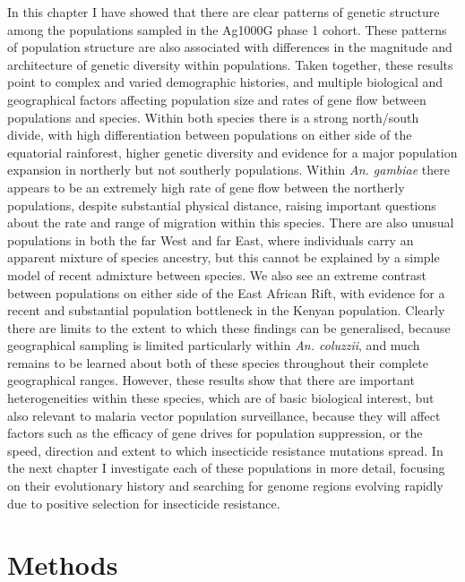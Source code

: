 \documentclass[a4paper,11pt,abstracton,hidelinks]{scrartcl}
\begin{document}
In this chapter I have showed that there are clear patterns of genetic structure among the populations sampled in the Ag1000G phase 1 cohort.
%
These patterns of population structure are also associated with differences in the magnitude and architecture of genetic diversity within populations.
%
Taken together, these results point to complex and varied demographic histories, and multiple biological and geographical factors affecting population size and rates of gene flow between populations and species.
%
Within both species there is a strong north/south divide, with high differentiation between populations on either side of the equatorial rainforest, higher genetic diversity and evidence for a major population expansion in northerly but not southerly populations.
%
Within \textit{An. gambiae} there appears to be an extremely high rate of gene flow between the northerly populations, despite substantial physical distance, raising important questions about the rate and range of migration within this species.
%
There are also unusual populations in both the far West and far East, where individuals carry an apparent mixture of species ancestry, but this cannot be explained by a simple model of recent admixture between species.
%
We also see an extreme contrast between populations on either side of the East African Rift, with evidence for a recent and substantial population bottleneck in the Kenyan population.
%
Clearly there are limits to the extent to which these findings can be generalised, because geographical sampling is limited particularly within \textit{An. coluzzii}, and much remains to be learned about both of these species throughout their complete geographical ranges.
%
However, these results show that there are important heterogeneities within these species, which are of basic biological interest, but also relevant to malaria vector population surveillance, because they will affect factors such as the efficacy of gene drives for population suppression, or the speed, direction and extent to which insecticide resistance mutations spread.
%
In the next chapter I investigate each of these populations in more detail, focusing on their evolutionary history and searching for genome regions evolving rapidly due to positive selection for insecticide resistance.


\section{Methods}\label{sec:methods}
\end{document}
